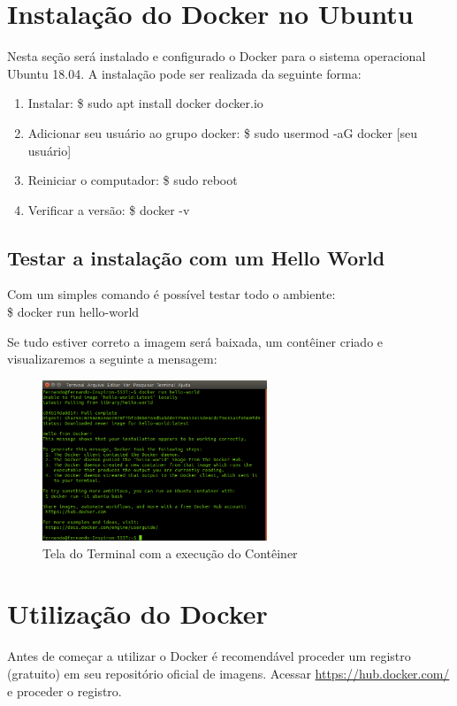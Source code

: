 \documentclass[a4paper,11pt]{article}
\begin{document}
\section{Instalação do Docker no Ubuntu}
Nesta seção será instalado e configurado o Docker para o sistema operacional Ubuntu 18.04. A instalação pode ser realizada da seguinte forma:
\begin{enumerate}
  \item Instalar: {\ttfamily\$ sudo apt install docker docker.io}
  \item Adicionar seu usuário ao grupo docker: {\ttfamily\$ sudo usermod -aG docker [seu usuário]}
  \item Reiniciar o computador: {\ttfamily\$ sudo reboot}
  \item Verificar a versão: {\ttfamily\$ docker -v}
\end{enumerate}

\subsection{Testar a instalação com um Hello World}
Com um simples comando é possível testar todo o ambiente: \\
{\ttfamily\$ docker run hello-world}

Se tudo estiver correto a imagem será baixada, um contêiner criado e visualizaremos a seguinte a mensagem:
\begin{figure}[H]
	\centering
	\includegraphics[width=0.6\textwidth]{imagem/hello.png}
	\caption{Tela do Terminal com a execução do Contêiner}
\end{figure}

\section{Utilização do Docker}
Antes de começar a utilizar o Docker é recomendável proceder um registro (gratuito) em seu repositório oficial de imagens. Acessar \url{https://hub.docker.com/} e proceder o registro.
\end{document}
